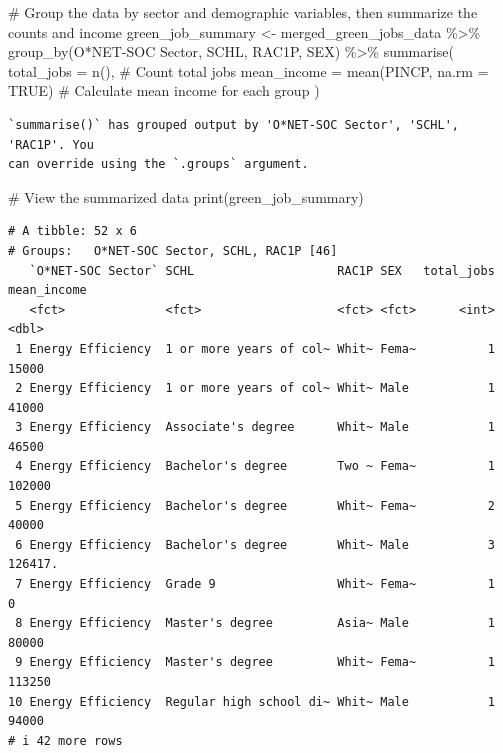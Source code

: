 \documentclass[
  letterpaper,
  DIV=11,
  numbers=noendperiod]{scrartcl}
\newenvironment{Shaded}{\begin{snugshade}}{\end{snugshade}}
\newcommand{\AttributeTok}[1]{\textcolor[rgb]{0.40,0.45,0.13}{#1}}
\newcommand{\CommentTok}[1]{\textcolor[rgb]{0.37,0.37,0.37}{#1}}
\newcommand{\ConstantTok}[1]{\textcolor[rgb]{0.56,0.35,0.01}{#1}}
\newcommand{\FunctionTok}[1]{\textcolor[rgb]{0.28,0.35,0.67}{#1}}
\newcommand{\NormalTok}[1]{\textcolor[rgb]{0.00,0.23,0.31}{#1}}
\newcommand{\OtherTok}[1]{\textcolor[rgb]{0.00,0.23,0.31}{#1}}
\newcommand{\SpecialCharTok}[1]{\textcolor[rgb]{0.37,0.37,0.37}{#1}}
\newcommand{\StringTok}[1]{\textcolor[rgb]{0.13,0.47,0.30}{#1}}
\begin{document}
\begin{Shaded}
\begin{Highlighting}[]
\CommentTok{\# Group the data by sector and demographic variables, then summarize the counts and income}
\NormalTok{green\_job\_summary }\OtherTok{\textless{}{-}}\NormalTok{ merged\_green\_jobs\_data }\SpecialCharTok{\%\textgreater{}\%}
  \FunctionTok{group\_by}\NormalTok{(}\StringTok{\textasciigrave{}}\AttributeTok{O*NET{-}SOC Sector}\StringTok{\textasciigrave{}}\NormalTok{, SCHL, RAC1P, SEX) }\SpecialCharTok{\%\textgreater{}\%}
  \FunctionTok{summarise}\NormalTok{(}
    \AttributeTok{total\_jobs =} \FunctionTok{n}\NormalTok{(),  }\CommentTok{\# Count total jobs}
    \AttributeTok{mean\_income =} \FunctionTok{mean}\NormalTok{(PINCP, }\AttributeTok{na.rm =} \ConstantTok{TRUE}\NormalTok{)  }\CommentTok{\# Calculate mean income for each group}
\NormalTok{  )}
\end{Highlighting}
\end{Shaded}

\begin{verbatim}
`summarise()` has grouped output by 'O*NET-SOC Sector', 'SCHL', 'RAC1P'. You
can override using the `.groups` argument.
\end{verbatim}

\begin{Shaded}
\begin{Highlighting}[]
\CommentTok{\# View the summarized data}
\FunctionTok{print}\NormalTok{(green\_job\_summary)}
\end{Highlighting}
\end{Shaded}

\begin{verbatim}
# A tibble: 52 x 6
# Groups:   O*NET-SOC Sector, SCHL, RAC1P [46]
   `O*NET-SOC Sector` SCHL                    RAC1P SEX   total_jobs mean_income
   <fct>              <fct>                   <fct> <fct>      <int>       <dbl>
 1 Energy Efficiency  1 or more years of col~ Whit~ Fema~          1      15000 
 2 Energy Efficiency  1 or more years of col~ Whit~ Male           1      41000 
 3 Energy Efficiency  Associate's degree      Whit~ Male           1      46500 
 4 Energy Efficiency  Bachelor's degree       Two ~ Fema~          1     102000 
 5 Energy Efficiency  Bachelor's degree       Whit~ Fema~          2      40000 
 6 Energy Efficiency  Bachelor's degree       Whit~ Male           3     126417.
 7 Energy Efficiency  Grade 9                 Whit~ Fema~          1          0 
 8 Energy Efficiency  Master's degree         Asia~ Male           1      80000 
 9 Energy Efficiency  Master's degree         Whit~ Fema~          1     113250 
10 Energy Efficiency  Regular high school di~ Whit~ Male           1      94000 
# i 42 more rows
\end{verbatim}
\end{document}
